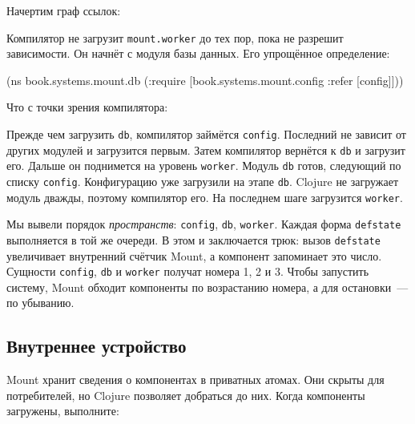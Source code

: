 \noindent
Начертим граф ссылок:


\begin{figure}[H]
  \small


\end{figure}

Компилятор не загрузит \verb|mount.worker| до тех пор, пока не разрешит
зависимости. Он начнёт с модуля базы данных. Его упрощённое определение:

\begin{english}
  \begin{clojure}
(ns book.systems.mount.db
  (:require
   [book.systems.mount.config :refer [config]]))
  \end{clojure}
\end{english}

\noindent
Что с точки зрения компилятора:

\begin{figure}[H]
  \small


\end{figure}

Прежде чем загрузить \verb|db|, компилятор займётся \verb|config|. Последний
не зависит от других модулей и загрузится первым. Затем компилятор вернётся к
\verb|db| и загрузит его. Дальше он поднимется на уровень
\verb|worker|. Модуль \verb|db| готов, следующий по списку
\verb|config|. Конфигурацию уже загрузили на этапе \verb|db|. Clojure не
загружает модуль дважды, поэтому компилятор его. На последнем шаге
загрузится \verb|worker|.


Мы вывели порядок \emph{пространств}: \verb|config|, \verb|db|,
\verb|worker|. Каждая форма \verb|defstate| выполняется в той же очереди. В
этом и заключается трюк: вызов \verb|defstate| увеличивает внутренний счётчик
Mount, а компонент запоминает это число. Сущности \verb|config|, \verb|db| и
\verb|worker| получат номера 1, 2 и 3. Чтобы запустить систему, Mount
обходит компоненты по возрастанию номера, а для остановки~--- по убыванию.

\subsection{Внутреннее устройство}

Mount хранит сведения о компонентах в приватных атомах. Они скрыты для
потребителей, но Clojure позволяет добраться до них. Когда компоненты загружены,
выполните:

